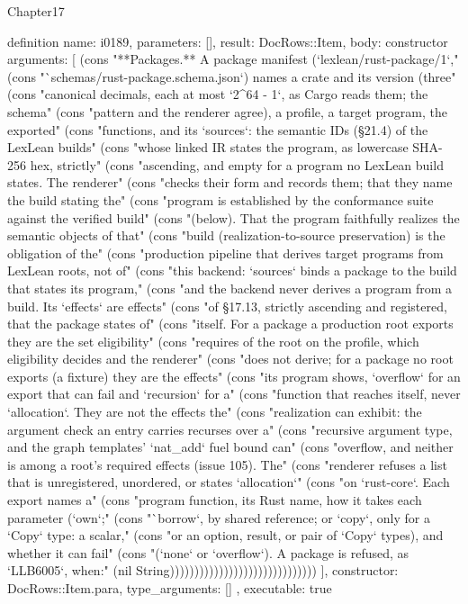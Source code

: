 \begin{lexlean}{Chapter17}
\begin{semanticmodule}
definition{
  name: i0189,
  parameters: [],
  result: DocRows::Item,
  body: constructor{
    arguments: [
      (cons "**Packages.** A package manifest (`lexlean/rust-package/1`," (cons "`schemas/rust-package.schema.json`) names a crate and its version (three" (cons "canonical decimals, each at most `2^64 - 1`, as Cargo reads them; the schema" (cons "pattern and the renderer agree), a profile, a target program, the exported" (cons "functions, and its `sources`: the semantic IDs (§21.4) of the LexLean builds" (cons "whose linked IR states the program, as lowercase SHA-256 hex, strictly" (cons "ascending, and empty for a program no LexLean build states. The renderer" (cons "checks their form and records them; that they name the build stating the" (cons "program is established by the conformance suite against the verified build" (cons "(below). That the program faithfully realizes the semantic objects of that" (cons "build (realization-to-source preservation) is the obligation of the" (cons "production pipeline that derives target programs from LexLean roots, not of" (cons "this backend: `sources` binds a package to the build that states its program," (cons "and the backend never derives a program from a build. Its `effects` are effects" (cons "of §17.13, strictly ascending and registered, that the package states of" (cons "itself. For a package a production root exports they are the set eligibility" (cons "requires of the root on the profile, which eligibility decides and the renderer" (cons "does not derive; for a package no root exports (a fixture) they are the effects" (cons "its program shows, `overflow` for an export that can fail and `recursion` for a" (cons "function that reaches itself, never `allocation`. They are not the effects the" (cons "realization can exhibit: the argument check an entry carries recurses over a" (cons "recursive argument type, and the graph templates' `nat_add` fuel bound can" (cons "overflow, and neither is among a root's required effects (issue 105). The" (cons "renderer refuses a list that is unregistered, unordered, or states `allocation`" (cons "on `rust-core`. Each export names a" (cons "program function, its Rust name, how it takes each parameter (`own`;" (cons "`borrow`, by shared reference; or `copy`, only for a `Copy` type: a scalar," (cons "or an option, result, or pair of `Copy` types), and whether it can fail" (cons "(`none` or `overflow`). A package is refused, as `LLB6005`, when:" (nil String))))))))))))))))))))))))))))))
    ],
    constructor: DocRows::Item.para,
    type_arguments: []
  },
  executable: true
}


\end{semanticmodule}
\end{lexlean}

